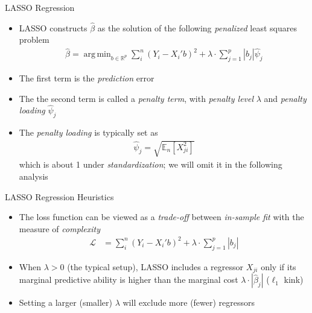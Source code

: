 \documentclass[aspectratio=1610,12pt,xcolor=dvipsnames]{beamer}
\DeclareMathOperator*{\argmin}{arg\,min}
\begin{document}
\begin{frame}{LASSO Regression}
\begin{itemize}
    \item LASSO constructs $\hat \beta$ as the solution of the following \textit{penalized} least squares problem
    \begin{align*}
        \hat \beta = \argmin_{b\in\mathbb{R}^{p}}\sum_i^n(Y_i - X_i'b)^2 + \lambda \cdot \sum_{j=1}^{p}|b_j| \hat \psi_j
    \end{align*}
    \item The first term is the \textit{prediction} error
    \item The the second term is called a \textit{penalty term}, with \textit{penalty level} $\lambda$ and \textit{penalty loading} $\hat \psi_j$
    \item The \textit{penalty loading} is typically set as 
    \begin{align*}
        \hat \psi_j = \sqrt{\mathbb{E}_n[X_{ji}^2]}
    \end{align*}
    which is about 1 under \textit{standardization}; we will omit it in the following analysis
\end{itemize}
\end{frame}

\begin{frame}{LASSO Regression Heuristics}

\begin{itemize}
    \item The loss function can be viewed as a \textit{trade-off} between \textit{in-sample fit} with the measure of \textit{complexity}
    \begin{align*}
        \mathcal{L} &= \sum_i^n(Y_i - X_i'b)^2 + \lambda \cdot \sum_{j=1}^{p}|b_j|
    \end{align*}
    \item When $\lambda > 0$ (the typical setup), LASSO includes a regressor $X_{ji}$ only if its marginal predictive ability is higher than the marginal cost $\lambda \cdot |\hat\beta_j|$ ($\ell_1$ kink)
    \item Setting a larger (smaller) $\lambda$ will exclude more (fewer) regressors
\end{itemize}
\end{frame}
\end{document}

